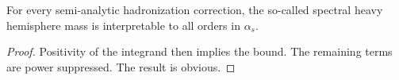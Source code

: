 \begin{corollary}[Renormalization]\label{thm:4}
For every semi-analytic hadronization correction, the so-called spectral
heavy hemisphere mass is interpretable to all orders in $\alpha_s$.
\end{corollary}

\begin{proof}
Positivity of the integrand then implies the bound. The remaining terms
are power suppressed. The result is obvious.
\end{proof}

